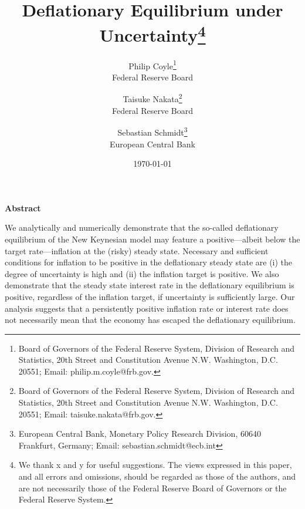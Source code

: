 \documentclass[11pt]{article}
\begin{document}
	
	\title{Deflationary Equilibrium under Uncertainty\footnote{We thank x and y for useful suggestions. The views expressed in this paper, and all errors and omissions, should be regarded as those of the authors, and are not necessarily those of the Federal Reserve Board of Governors or the Federal Reserve System.}}
	\author{
		Philip Coyle\thanks{Board of Governors of the Federal Reserve System, Division of Research and Statistics, 20th Street and Constitution Avenue N.W. Washington, D.C. 20551; Email: philip.m.coyle@frb.gov.}\\
		Federal Reserve Board
		\and 
		Taisuke Nakata\thanks{Board of Governors of the Federal Reserve System, Division of Research and Statistics, 20th Street and Constitution Avenue N.W. Washington, D.C. 20551; Email: taisuke.nakata@frb.gov.}\\
		Federal Reserve Board
		\and Sebastian Schmidt\thanks{%
			European Central Bank, Monetary Policy Research Division, 60640 Frankfurt, Germany; Email: sebastian.schmidt@ecb.int}\\
		European Central Bank
	}
	\date{\mydate\today}
	
	\maketitle
	
	\vspace{-0.3in}
	
	\begin{center}
		\textbf{Abstract}
	\end{center}
	\noindent We analytically and numerically demonstrate that the so-called deflationary equilibrium of the New Keynesian model may feature a positive---albeit below the target rate---inflation at the (risky) steady state. Necessary and sufficient conditions for inflation to be positive in the deflationary steady state are (i) the degree of uncertainty is high and (ii) the inflation target is positive. We also demonstrate that the steady state interest rate in the deflationary equilibrium is positive, regardless of the inflation target, if uncertainty is sufficiently large. Our analysis suggests that a persistently positive inflation rate or interest rate does not necessarily mean that the economy has escaped the deflationary equilibrium. 
	
\end{document}
